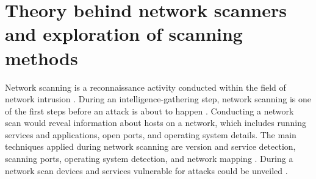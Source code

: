 \section{Theory behind network scanners and exploration of scanning methods} %
\label{s:HowToScanning}

Network scanning is a reconnaissance activity conducted within the field of network intrusion \autocite{TaxonomyOfNetworkScanning}. During an intelligence-gathering step, network scanning is one of the first steps before an attack is about to happen \autocite{HOUMZ2021103230}.
Conducting a network scan would reveal information about hosts on a network, which includes running services and applications, open ports, and operating system details. The main techniques applied during network scanning are version and service detection, scanning ports, operating system detection, and network mapping \autocite{pinkard2008nmap}. During a network scan devices and services vulnerable for attacks could be unveiled \autocite{HOUMZ2021103230}.





